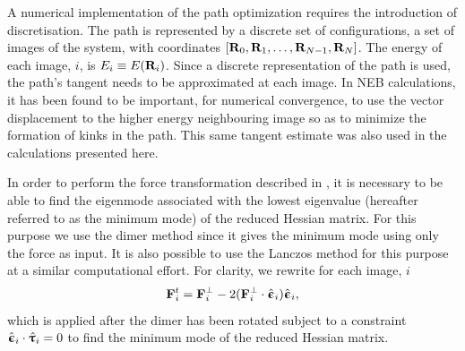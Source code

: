 A numerical implementation of the path optimization requires the introduction of discretisation.
The path is represented by a discrete set of configurations, a set of images of the system,
with coordinates $[{\mathrm{\mathbf{\bm{R}}}}_{0}, {\mathrm{\mathbf{\bm{R}}}}_{1}, \dotsc, {\mathrm{\mathbf{\bm{R}}}}_{N-1}, {\mathrm{\mathbf{\bm{R}}}}_{N}]$.
The energy of each image, $i$, is  $E_i \equiv E({\mathrm{\mathbf{\bm{R}}}}_i)$.
Since a discrete representation of the path is used, the path's tangent needs to be approximated at each image.
In NEB calculations, it has been found to be important, for numerical convergence, to use the vector displacement to the higher energy neighbouring image so as to minimize the formation of kinks in the path\cite{neb-tangent-2000}.
This same tangent estimate was also used in the calculations presented here.

In order to perform the force transformation described in , it is necessary to be able to find the eigenmode associated with the lowest eigenvalue (hereafter referred to as the minimum mode) of the reduced Hessian matrix.
For this purpose we use the dimer method\cite{dimer-original-1999, dimer-olsen-2004} since it gives the minimum mode using only the force as input.  It is also possible to use the Lanczos method for this purpose \cite{dimer-olsen-2004} at a similar computational effort.
For clarity, we rewrite  for each image, $i$
\begin{equation}
{\ensuremath{\mathrm{\mathbf{\bm{F}}}}}_i^t = {\mathrm{\mathbf{\bm{F}}}}^\perp_i - 2 ({\mathrm{\mathbf{\bm{F}}}}^\perp_i \cdot \hat{{\mathrm{\mathbf{\bm{\upepsilon}}}}}_i) \hat{{\mathrm{\mathbf{\bm{\upepsilon}}}}}_i,
\label{eq:minmode-force}
\end{equation}
which is applied after the dimer has been rotated subject to a constraint $\hat{{\mathrm{\mathbf{\bm{\upepsilon}}}}}_i \cdot \hat{{\mathrm{\mathbf{\bm{\uptau}}}}}_i =0$ to find the minimum mode of the reduced Hessian matrix.



